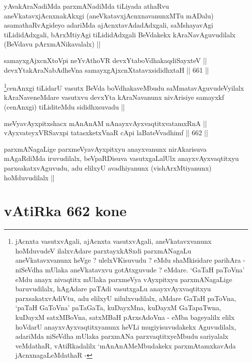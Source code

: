 \begin{artha}
yAvakAraNadiMda parxmANadiMda tiLiyada athaRvu aneVkatavxjAcnxnakAkxgi
(aneVkatavxjAcnxnavanunxMTu mADalu) asamathaRvAgideyo adariMda
ajAcnxtavAdadAdxgali, saMshayavAgi tiLididAdxgali, bArxMtiyAgi
tiLididAdxgali BeVdakekx kAraNavAguvudilalx (BeVdavu pArxmANikavalalx) ||
\end{artha}


\begin{shl}
samayxgAjxcnXtoV\s pi neYvAthoVR devxYtaboVdhakaqdiSayxteV || \\
devxYtakAraNabAdheVna samayxgAjxcnXtatavxsididhxtaH ||  661 ||  
\end{shl}

\begin{artha}
\footnote{jAcnxta vasutxvAgali, ajAcnxta vasutxvAgali,
  aneVkatavxvanunx hoMduvudeV ilalxvAdare parxtayxkASxdi parxmANagaLu
  aneVkatavxvanunx heVge ? ulelxVKisuvudu ? eMdu shaMkisidare parihAra
  - niSeVdha mUlaka aneVkatavxvu gotAtxguvude ? eMdare. `GaTaH
  paToVna' eMdu anayx nivaqtitx mUlaka parxmeVya vAyxpitxyu
  parxmANagaLige baruvudilalx, hAgAdare paTAdi vasutxgaLu
  anayxvAyxvaqtitxyu parxsakatxvAdiVtu, adu elilxyU nilulxvudilalx,
  aMdare GaTaH paToVna, `paTaH GaToVna' paTaGaTa, kuDayxMna, kuDayxM
  GaTapaTwna, kuDayxM satxMBoVna, satxMBaH pArxsAdoVna - eMba
  bageyalilx elilx hoVdarU anayxvAyxvaqtitxyanunx heVLi
  mugiyisuvudakekx Aguvudilalx, adariMda niSeVdha mUlaka parxmANa
  parxvaqtitxyeMbudu sariyalalx veMdathaR, vAtiRkadalilx
  `mAnAnAMeMbudakekx parxmAtamxkavAda jAcnxnagaLeMdathaR -}cenAnxgi tiLidarU vasutx BeVda boVdhakaveMbudu saMmatavAguvudeVyilalx
kAraNaveneMdare vasutxvu devxYta kAraNavanunx nivArisiye samayxkf
(cenAnxgi) tiLiditeMdu sididhxsuvadu ||
\end{artha}

\begin{shl}
meVyavAyxpitxshacx mAnAnAM nAnayxvAyxvaqtitxvatamxRnA || \\
vAyxvateyxVRSavxpi tatasxketxVnaR cApi laBateV\s vadhimf  ||  662 ||  
\end{shl}

\begin{artha}
parxmANagaLige parxmeVyavAyxpitxyu anayxvanunx nirAkarisuva mAgaRdiMda
iruvudilalx, beVpaRDisuva vasutxgaLalUlx anayxvAyxvaqtitxyu
parxsakatxvAguvudu, adu elilxyU avadhiyanunx (vishArxMtiyanunx)
hoMduvudilalx ||
\end{artha}

\section*{vAtiRka 662 kone}
